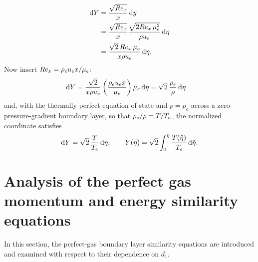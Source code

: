 \begin{align}
  \mathrm{d} Y
  &=
  \frac{\sqrt{Re_x}}{x}\,\mathrm{d} y
  \nonumber\\
  &=
  \frac{\sqrt{Re_x}}{x}
  \frac{\sqrt{2Re_x\,\mu_e^2}}{\rho u_e}\,\mathrm{d}\eta
  \nonumber\\
  &=
  \frac{\sqrt{2}\,Re_x\,\mu_e}{x\rho u_e}\,\mathrm{d}\eta.
  \label{app:ma:eq:Ycancel_step1}
\end{align}
Now insert \(Re_x=\rho_eu_e x/\mu_e\):
\begin{align}
  \mathrm{d} Y
  &=
  \frac{\sqrt{2}}{x\rho u_e}
  \left(\frac{\rho_eu_e x}{\mu_e}\right)
  \mu_e\,\mathrm{d}\eta
  =
  \sqrt{2}\,\frac{\rho_e}{\rho}\,\mathrm{d}\eta
  \label{app:ma:eq:Ycancel_step2}
\end{align}
and, with the thermally perfect equation of state and \(p=p_e\) across a zero-pressure-gradient boundary layer, so that \(\rho_e/\rho=T/T_e\), the normalized coordinate satisfies
\begin{equation}
  \mathrm{d} Y=\sqrt{2}\,\frac{T}{T_e}\,\mathrm{d}\eta,
  \qquad
  Y(\eta)=\sqrt{2}\int_0^\eta \frac{T(\tilde{\eta})}{T_e}\,\mathrm{d}\tilde{\eta}.
  \label{app:ma:eq:Ycancel}
\end{equation}
\section{Analysis of the perfect gas momentum and energy similarity equations}
\label{app:ma:sec:perfect_gas_similarity}
In this section, the perfect-gas boundary layer similarity equations are introduced and examined with respect to their dependence on \(d_1\).

